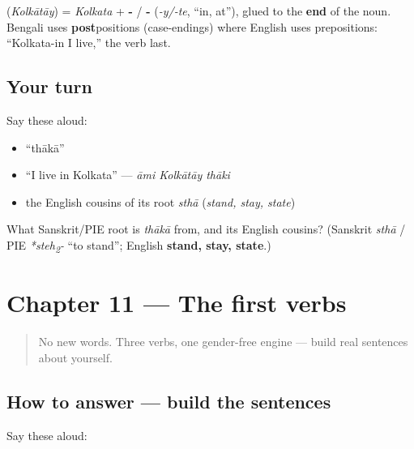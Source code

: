 \begin{grammarlens}[title={Grammar Lens: \textquotedblleft{}in\textquotedblright{} comes after the noun}]
\textbf{} (\emph{Kolkātāy}) = \emph{Kolkata} + \textbf{-} / \textbf{-} (\emph{-y/-te}, \textquotedblleft{}in, at\textquotedblright{}), glued to the \textbf{end} of the noun. Bengali uses \textbf{post}positions (case-endings) where English uses prepositions: \textquotedblleft{}Kolkata-in I live,\textquotedblright{} the verb last.
\end{grammarlens}

\subsection*{Your turn}
Say these aloud:

\begin{itemize}
\raggedright
  \item \textquotedblleft{}thākā\textquotedblright{}
  \item \textquotedblleft{}I live in Kolkata\textquotedblright{} — \emph{āmi Kolkātāy thāki}
  \item the English cousins of its root \emph{sthā} (\emph{stand, stay, state})
\end{itemize}

\begin{tcolorbox}[breakable,colback=teal!4,colframe=teal!35!black,title={Before you move on}]
What Sanskrit/PIE root is \emph{thākā} from, and its English cousins? (Sanskrit \emph{sthā} / PIE \emph{*steh\textsubscript{2}-} \textquotedblleft{}to stand\textquotedblright{}; English \textbf{stand, stay, state}.)
\end{tcolorbox}
\section[Practice]{Chapter 11 — The first verbs}

\label{lesson:BN-C05-practice}



\begin{quote}
No new words. Three verbs, one gender-free engine — build real sentences about yourself.
\end{quote}

\subsection*{How to answer — build the sentences}
Say these aloud:

